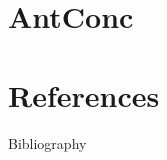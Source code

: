 \documentclass{beamer}
\begin{document}
\section{AntConc}
	
\section{References}

\begin{frame}[fragile]{Bibliography}




\end{frame}
\end{document}
